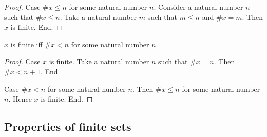 \documentclass[../../set-theory.tex]{subfiles}
\begin{document}
\begin{forthel}
\begin{proof}
      Case $\# x \leq n$ for some natural number $n$.
        Consider a natural number $n$ such that $\# x \leq n$.
        Take a natural number $m$ such that $m \leq n$ and $\# x = m$.
        Then $x$ is finite.
      End.
    \end{proof}

    \begin{corollary}
      $x$ is finite iff $\# x < n$ for some natural number $n$.
    \end{corollary}
    \begin{proof}
      Case $x$ is finite.
        Take a natural number $n$ such that $\# x = n$.
        Then $\# x < n + 1$.
      End.

      Case $\# x < n$ for some natural number $n$.
        Then $\# x \leq n$ for some natural number $n$.
        Hence $x$ is finite.
      End.
    \end{proof}
  \end{forthel}


  \subsection{Properties of finite sets}
\end{document}
